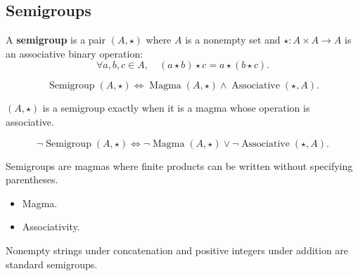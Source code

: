 \subsection{Semigroups}
\label{subsec:semigroups}

\begin{tcolorbox}[title={Definition --- Semigroup}]
\begin{definition}[Semigroup]
\label{def:semigroup}
A \textbf{semigroup} is a pair $(A,\star)$ where $A$ is a nonempty set and
$\star:A\times A\to A$ is an associative binary operation:
\[
\forall a,b,c \in A,\quad
(a\star b)\star c=a\star(b\star c).
\]
\end{definition}
\end{tcolorbox}

\begin{remark*}
\[
\operatorname{Semigroup}(A,\star)
\Longleftrightarrow
\operatorname{Magma}(A,\star)
\land
\operatorname{Associative}(\star,A).
\]
\end{remark*}

\begin{remark*}
$(A,\star)$ is a semigroup exactly when it is a magma whose operation is
associative.
\end{remark*}

\begin{remark*}
\[
\neg\operatorname{Semigroup}(A,\star)
\Longleftrightarrow
\neg\operatorname{Magma}(A,\star)
\lor
\neg\operatorname{Associative}(\star,A).
\]
\end{remark*}

\begin{remark*}[Interpretation]
Semigroups are magmas where finite products can be written without specifying
parentheses.
\end{remark*}

\begin{remark*}[Dependencies]
\begin{itemize}
  \item Magma.
  \item Associativity.
\end{itemize}
\end{remark*}

\begin{remark*}[Examples]
Nonempty strings under concatenation and positive integers under addition are
standard semigroups.
\end{remark*}
